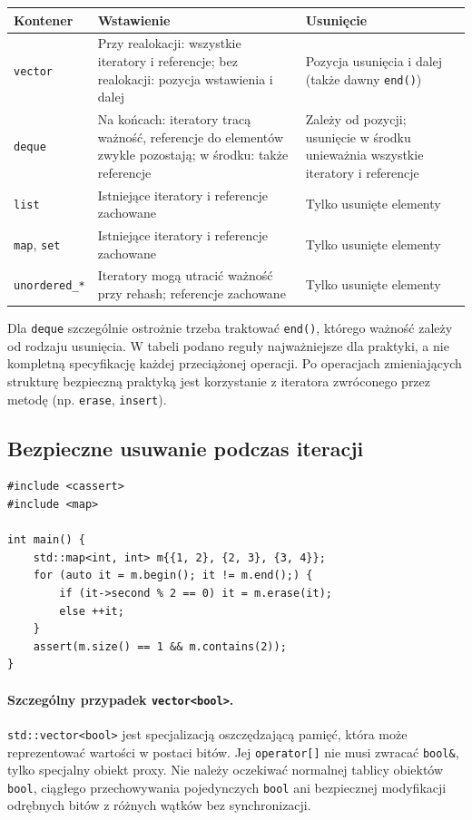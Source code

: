 \begin{center}
\footnotesize
\begin{tabularx}{\textwidth}{@{}lXX@{}}
\toprule
\textbf{Kontener} & \textbf{Wstawienie} & \textbf{Usunięcie} \\
\midrule
\texttt{vector} & Przy realokacji: wszystkie iteratory i referencje; bez realokacji: pozycja wstawienia i dalej & Pozycja usunięcia i dalej (także dawny \texttt{end()}) \\
\texttt{deque} & Na końcach: iteratory tracą ważność, referencje do elementów zwykle pozostają; w środku: także referencje & Zależy od pozycji; usunięcie w środku unieważnia wszystkie iteratory i referencje \\
\texttt{list} & Istniejące iteratory i referencje zachowane & Tylko usunięte elementy \\
\texttt{map}, \texttt{set} & Istniejące iteratory i referencje zachowane & Tylko usunięte elementy \\
\texttt{unordered\_*} & Iteratory mogą utracić ważność przy rehash; referencje zachowane & Tylko usunięte elementy \\
\bottomrule
\end{tabularx}
\end{center}

Dla \texttt{deque} szczególnie ostrożnie trzeba traktować
\texttt{end()}, którego ważność zależy od rodzaju usunięcia.
W tabeli podano reguły najważniejsze dla praktyki, a nie kompletną
specyfikację każdej przeciążonej operacji. Po operacjach zmieniających
strukturę bezpieczną praktyką jest korzystanie z iteratora zwróconego
przez metodę (np. \texttt{erase}, \texttt{insert}).

\subsection{Bezpieczne usuwanie podczas iteracji}

\begin{lstlisting}[caption={Usuwanie elementow map podczas iteracji (C++20); kompletny program.}]
#include <cassert>
#include <map>

int main() {
    std::map<int, int> m{{1, 2}, {2, 3}, {3, 4}};
    for (auto it = m.begin(); it != m.end();) {
        if (it->second % 2 == 0) it = m.erase(it);
        else ++it;
    }
    assert(m.size() == 1 && m.contains(2));
}
\end{lstlisting}

\paragraph{Szczególny przypadek \texttt{vector<bool>}.}
\texttt{std::vector<bool>} jest specjalizacją oszczędzającą pamięć,
która może reprezentować wartości w postaci bitów. Jej \texttt{operator[]}
nie musi zwracać \texttt{bool\&}, tylko specjalny obiekt proxy. Nie
należy oczekiwać normalnej tablicy obiektów \texttt{bool}, ciągłego
przechowywania pojedynczych \texttt{bool} ani bezpiecznej modyfikacji
odrębnych bitów z różnych wątków bez synchronizacji.

